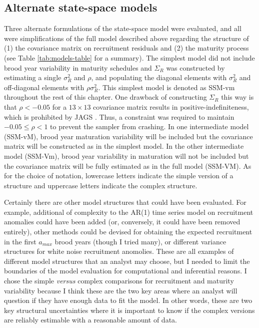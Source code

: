 \documentclass[12pt,]{book}
\theoremstyle{definition}
\theoremstyle{definition}
\theoremstyle{definition}
\theoremstyle{remark}
\begin{document}
\subsection{Alternate state-space models}\label{alt-ssm-models}

\noindent
Three alternate formulations of the state-space model were evaluated,
and all were simplifications of the full model described above regarding
the structure of (1) the covariance matrix on recruitment residuals and
(2) the maturity process (see Table \ref{tab:models-table} for a
summary). The simplest model did not include brood year variability in
maturity schedules and \(\Sigma_R\) was constructed by estimating a
single \(\sigma_R^2\) and \(\rho\), and populating the diagonal elements
with \(\sigma_R^2\) and off-diagonal elements with \(\rho \sigma_R^2\).
This simplest model is denoted as SSM-vm throughout the rest of this
chapter. One drawback of constructing \(\Sigma_R\) this way is that
\(\rho < -0.05\) for a \(13 \times 13\) covariance matrix results in
positive-indefiniteness, which is prohibited by JAGS
\citep{plummer-2017}. Thus, a constraint was required to maintain
\(-0.05 \le \rho < 1\) to prevent the sampler from crashing. In one
intermediate model (SSM-vM), brood year maturation variability will be
included but the covariance matrix will be constructed as in the
simplest model. In the other intermediate model (SSM-Vm), brood year
variability in maturation will not be included but the covariance matrix
will be fully estimated as in the full model (SSM-VM). As for the choice
of notation, lowercase letters indicate the simple version of a
structure and uppercase letters indicate the complex structure.

Certainly there are other model structures that could have been
evaluated. For example, additional of complexity to the AR(1) time
series model on recruitment anomalies could have been added (or,
conversely, it could have been removed entirely), other methods could be
devised for obtaining the expected recruitment in the first \(a_{max}\)
brood years (though I tried many), or different variance structures for
white noise recruitment anomolies. These are all examples of different
model structures that an analyst may choose, but I needed to limit the
boundaries of the model evaluation for computational and inferential
reasons. I chose the simple \emph{versus} complex comparisons for
recruitment and maturity variability because I think these are the two
key areas where an analyst will question if they have enough data to fit
the model. In other words, these are two key structural uncertainties
where it is important to know if the complex versions are reliably
estimable with a reasonable amount of data.
\end{document}
